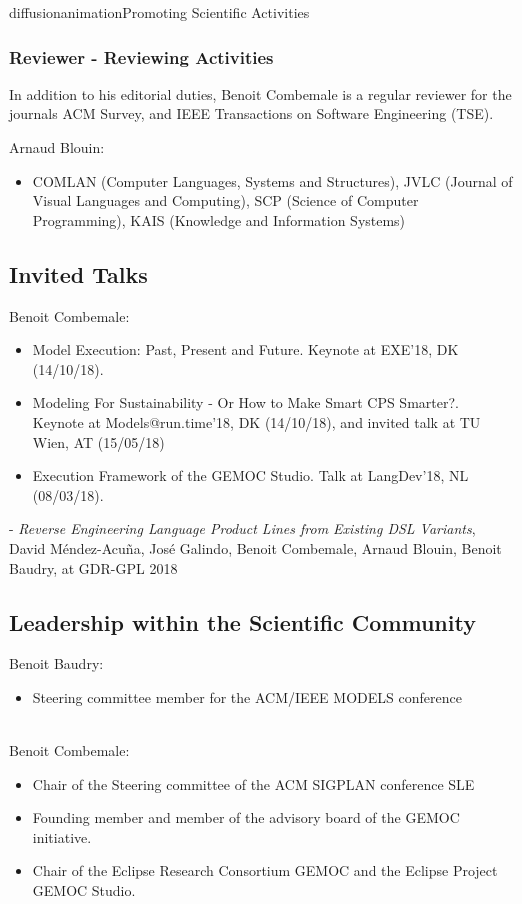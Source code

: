 \documentclass{ra2018}
\begin{document}
\begin{module}{diffusion}{animation}{Promoting Scientific Activities}
    \subsubsection{Reviewer - Reviewing Activities}
    
In addition to his editorial duties, Benoit Combemale is a regular reviewer for the journals ACM Survey, and IEEE Transactions on Software Engineering (TSE).


Arnaud Blouin:
\begin{itemize}
    \item COMLAN (Computer Languages, Systems and Structures), JVLC (Journal of Visual Languages and Computing), SCP (Science of Computer Programming), KAIS (Knowledge and Information Systems)
\end{itemize} 
    
\subsection{Invited Talks}

Benoit Combemale: 
\begin{itemize}
	\item Model Execution: Past, Present and Future. Keynote at EXE’18, DK (14/10/18).
	\item Modeling For Sustainability - Or How to Make Smart CPS Smarter?. Keynote at Models@run.time’18, DK (14/10/18), and invited talk at TU Wien, AT (15/05/18)
	\item Execution Framework of the GEMOC Studio. Talk at LangDev’18, NL (08/03/18).
\end{itemize}


- \emph{Reverse Engineering Language Product Lines from Existing DSL Variants}, David Méndez-Acuña, José Galindo, Benoit Combemale, Arnaud Blouin, Benoit Baudry, at GDR-GPL 2018


\subsection{Leadership within the Scientific Community}

Benoit Baudry:
\begin{itemize}
	\item Steering committee member for the ACM/IEEE MODELS conference
\end{itemize}

~\\
Benoit Combemale:
\begin{itemize}
	\item Chair of the Steering committee of the ACM SIGPLAN conference SLE
	\item Founding member and member of the advisory board of the GEMOC initiative. 
	\item Chair of the Eclipse Research Consortium GEMOC and the Eclipse Project GEMOC Studio. 
\end{itemize}




\end{module}
\end{document}
